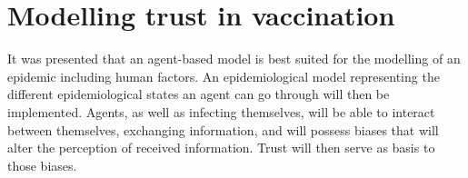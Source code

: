 \section{Modelling trust in vaccination}

It was presented that an agent-based model is best suited for the modelling of an epidemic including human factors. An epidemiological model representing the different epidemiological states an agent can go through will then be implemented. Agents, as well as infecting themselves, will be able to interact between themselves, exchanging information, and will possess biases that will alter the perception of received information. Trust will then serve as basis to those biases.
